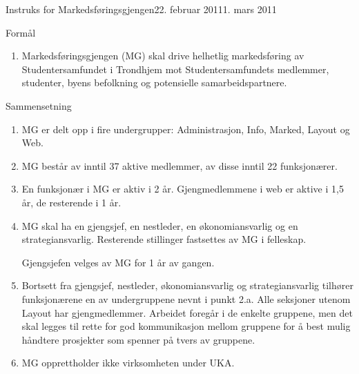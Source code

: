 \begin{instruks}{Instruks for Markedsføringsgjengen}{22. februar 2011}{1. mars 2011 }

    \begin{instruksledd}{Formål}
        \begin{enumerate}
            \item Markedsføringsgjengen (MG) skal drive helhetlig markedsføring av Studentersamfundet
                i Trondhjem mot
                Studentersamfundets medlemmer, studenter, byens befolkning og potensielle samarbeidspartnere.
        \end{enumerate}
    \end{instruksledd}

    \begin{instruksledd}{Sammensetning}
        \begin{enumerate}
            \item MG er delt opp i fire undergrupper: Administrasjon, Info, Marked, Layout og Web.
            \item MG består av inntil 37 aktive medlemmer, av disse inntil 22 funksjonærer.
            \item En funksjonær i MG er aktiv i 2 år. Gjengmedlemmene i web er aktive i 1,5 år, de
                resterende i 1 år.
            \item MG skal ha en gjengsjef, en nestleder, en økonomiansvarlig og en strategiansvarlig. Resterende stillinger fastsettes
                av MG i felleskap.

                Gjengsjefen velges av MG for 1 år av gangen.
            \item Bortsett fra gjengsjef, nestleder, økonomiansvarlig og strategiansvarlig tilhører funksjonærene en av undergruppene nevnt i punkt 2.a.
                Alle
                seksjoner utenom Layout har gjengmedlemmer. Arbeidet foregår i de enkelte gruppene, men det skal
                legges til
                rette for god kommunikasjon mellom gruppene for å best mulig håndtere prosjekter som spenner på
                tvers av
                gruppene.
            \item MG opprettholder ikke virksomheten under UKA.
        \end{enumerate}
    \end{instruksledd}


\end{instruks}

